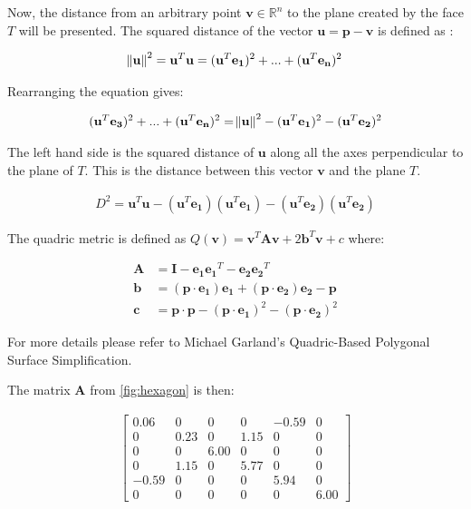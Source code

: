 Now, the distance from an arbitrary point $\mathbf{v}\in\mathbb{R}^n$ to the plane created by the face $T$ will be presented. The squared distance of the vector $\mathbf{u} = \mathbf{p} - \mathbf{v}$ is defined as \cite{garland99}:

\begin{align}
\norm{\mathbf{u}}^2 = \mathbf{u}^T\mathbf{u} = (\mathbf{u}^T\mathbf{e_1})^2 + ... +  (\mathbf{u}^T\mathbf{e_n})^2
\end{align}

Rearranging the equation gives:

\begin{align}
(\mathbf{u}^T\mathbf{e_3})^2 + ... +  (\mathbf{u}^T\mathbf{e_n})^2 = \norm{\mathbf{u}}^2 - (\mathbf{u}^T\mathbf{e_1})^2 - (\mathbf{u}^T\mathbf{e_2})^2
\end{align}

The left hand side is the squared distance of $\mathbf{u}$ along all the axes perpendicular to the plane of $T$. This is the distance between this vector $\mathbf{v}$ and the plane $T$.

\begin{align}
D^2 = \mathbf{u}^T\mathbf{u} - (\mathbf{u}^T\mathbf{e_1})(\mathbf{u}^T\mathbf{e_1}) - (\mathbf{u}^T\mathbf{e_2})(\mathbf{u}^T\mathbf{e_2})
\end{align}

The quadric metric is defined as $Q(\mathbf{v}) = \mathbf{v}^T\mathbf{A}\mathbf{v} + 2\mathbf{b}^T\mathbf{v} + c$ where:

\begin{align}
\mathbf{A} &= \mathbf{I} - \mathbf{e_1}\mathbf{e_1}^T - \mathbf{e_2}\mathbf{e_2}^T\\
\mathbf{b} &= (\mathbf{p} \cdot \mathbf{e_1})\mathbf{e_1} + (\mathbf{p} \cdot \mathbf{e_2})\mathbf{e_2} - \mathbf{p}\\ 
\mathbf{c} &= \mathbf{p} \cdot \mathbf{p} - (\mathbf{p} \cdot \mathbf{e_1})^2 - (\mathbf{p} \cdot \mathbf{e_2})^2 
\end{align}

For more details please refer to Michael Garland's Quadric-Based Polygonal Surface Simplification.

The matrix $\mathbf{A}$ from \ref{fig:hexagon} is then:

\begin{align}
\left[
\begin{array}{rrrrrr}
0.06 & 0 & 0 & 0 & -0.59 & 0\\
0 & 0.23 & 0 & 1.15 & 0 & 0\\
0 & 0 & 6.00 & 0 & 0 & 0\\
0 & 1.15 & 0 & 5.77 & 0 & 0\\
-0.59 & 0 & 0 & 0 & 5.94 & 0\\
0 & 0 & 0 & 0 & 0 & 6.00
\end{array}\right]
\end{align}

